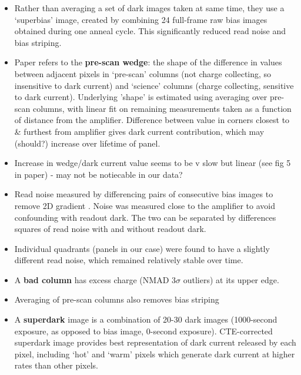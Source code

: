 \documentclass[10pt,fleqn]{article}
\begin{document}
\begin{itemize}
\item Rather than averaging a set of dark images taken at same time, they use a `superbias' image, created by combining 24 full-frame raw bias images obtained during one anneal cycle. This significantly reduced read noise and bias striping. 

\item Paper refers to the \textbf{pre-scan wedge}: the shape of the difference in values between adjacent pixels in `pre-scan' columns (not charge collecting, so insensitive to dark current) and `science' columns (charge collecting, sensitive to dark current). Underlying 'shape' is estimated using averaging over pre-scan columns, with linear fit on remaining measurements taken as a function of distance from the amplifier. Difference between value in corners closest to \& furthest from amplifier gives dark current contribution, which may (should?) increase over lifetime of panel.

\item Increase in wedge/dark current value seems to be v slow  but linear (see fig 5 in paper) - may not be notiecable in our data?

\item Read noise measured by differencing pairs of consecutive bias images to remove 2D gradient \cite{readNoise2013}. Noise was measured close to the amplifier to avoid confounding with readout dark. The two can be separated by differences squares of read noise with and without readout dark.

\item Individual quadrants (panels in our case) were found to have a slightly different read noise, which remained relatively stable over time.

\item A \textbf{bad column} has excess charge (NMAD $3\sigma$ outliers) at its upper edge.

\item Averaging of pre-scan columns also removes bias striping \cite{biasStriping2011}

\item A \textbf{superdark} image is a combination of 20-30 dark images (1000-second exposure, as opposed to bias image, 0-second exposure). CTE-corrected superdark image provides best representation of dark current released by each pixel, including `hot' and `warm' pixels which generate dark current at higher rates than other pixels.
\end{itemize}
\end{document}
